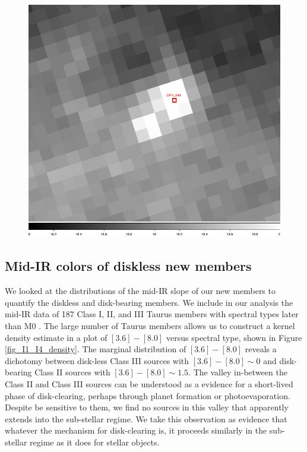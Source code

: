 \begin{figure}[ht!]
\begin{minipage}[b]{0.3\linewidth}
\end{minipage}
\hspace{0.5cm}
\begin{minipage}[b]{0.3\linewidth}
\centering
\includegraphics[scale=0.15]{chIMACS/figures/OPH_349_IRAC4_image}
\end{minipage}
\end{figure}

\subsection{Mid-IR colors of diskless new members}

We looked at the distributions of the mid-IR slope of our new members to quantify the diskless and disk-bearing members.  We include in our analysis the mid-IR data of 187 Class I, II, and III Taurus members with spectral types later than M0 \citep{2010ApJS..186..111L}.  The large number of Taurus members allows us to construct a kernel density estimate in a plot of $[3.6]-[8.0]$ versus spectral type, shown in Figure \ref{fig_I1_I4_density}.  The marginal distribution of $[3.6]-[8.0]$ reveals a dichotomy between disk-less Class III sources with $[3.6]-[8.0] \sim 0$ and disk-bearing Class II sources with $[3.6]-[8.0] \sim 1.5$.  The valley in-between the Class II and Class III sources can be understood as a evidence for a short-lived phase of disk-clearing, perhaps through planet formation or photoevaporation.  Despite be sensitive to them, we find no sources in this valley that apparently extends into the sub-stellar regime.  We take this observation as evidence that whatever the mechanism for disk-clearing is, it proceeds similarly in the sub-stellar regime as it does for stellar objects.  

